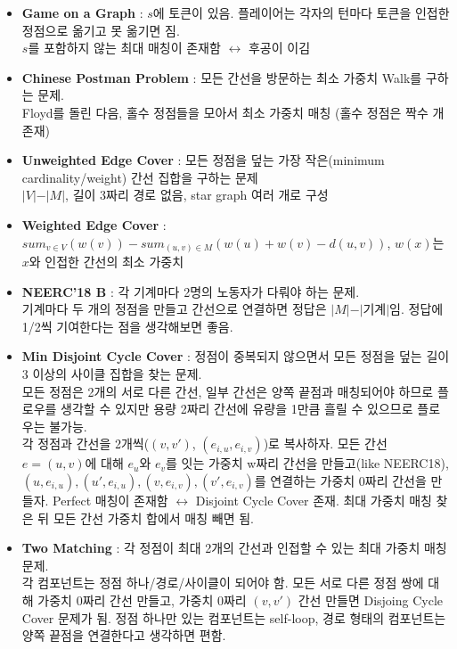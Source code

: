 \documentclass[landscape, 8pt, a4paper, oneside, twocolumn]{extarticle}
\begin{document}
\begin{itemize}
    \setlength\itemsep{0.1em}
    \item \textbf{Game on a Graph} : $s$에 토큰이 있음. 플레이어는 각자의 턴마다 토큰을 인접한 정점으로 옮기고 못 옮기면 짐.\\
    $s$를 포함하지 않는 최대 매칭이 존재함 $\leftrightarrow$ 후공이 이김
    \item \textbf{Chinese Postman Problem} : 모든 간선을 방문하는 최소 가중치 Walk를 구하는 문제.\\
    Floyd를 돌린 다음, 홀수 정점들을 모아서 최소 가중치 매칭 (홀수 정점은 짝수 개 존재)
    \item \textbf{Unweighted Edge Cover} : 모든 정점을 덮는 가장 작은(minimum cardinality/weight) 간선 집합을 구하는 문제\\
    $\vert V\vert - \vert M\vert$, 길이 3짜리 경로 없음, star graph 여러 개로 구성
    \item \textbf{Weighted Edge Cover} : $sum_{v \in V}(w(v)) - sum_{(u,v) \in M}(w(u) + w(v) - d(u,v))$, $w(x)$는 $x$와 인접한 간선의 최소 가중치
    \item \textbf{NEERC'18 B} : 각 기계마다 2명의 노동자가 다뤄야 하는 문제.\\
    기계마다 두 개의 정점을 만들고 간선으로 연결하면 정답은 $\vert M\vert - \vert\text{기계}\vert$임. 정답에 1/2씩 기여한다는 점을 생각해보면 좋음.
    \item \textbf{Min Disjoint Cycle Cover} : 정점이 중복되지 않으면서 모든 정점을 덮는 길이 3 이상의 사이클 집합을 찾는 문제.\\
    모든 정점은 2개의 서로 다른 간선, 일부 간선은 양쪽 끝점과 매칭되어야 하므로 플로우를 생각할 수 있지만 용량 2짜리 간선에 유량을 1만큼 흘릴 수 있으므로 플로우는 불가능.\\
    각 정점과 간선을 2개씩($(v, v')$, $(e_{i,u},e_{i,v})$)로 복사하자. 모든 간선 $e=(u,v)$에 대해 $e_u$와 $e_v$를 잇는 가중치 w짜리 간선을 만들고(like NEERC18), $(u,e_{i,u}), (u',e_{i,u}), (v,e_{i,v}), (v',e_{i,v})$를 연결하는 가중치 0짜리 간선을 만들자. Perfect 매칭이 존재함 $\leftrightarrow$ Disjoint Cycle Cover 존재. 최대 가중치 매칭 찾은 뒤 모든 간선 가중치 합에서 매칭 빼면 됨.
    \item \textbf{Two Matching} : 각 정점이 최대 2개의 간선과 인접할 수 있는 최대 가중치 매칭 문제.\\
    각 컴포넌트는 정점 하나/경로/사이클이 되어야 함. 모든 서로 다른 정점 쌍에 대해 가중치 0짜리 간선 만들고, 가중치 0짜리 $(v,v')$ 간선 만들면 Disjoing Cycle Cover 문제가 됨. 정점 하나만 있는 컴포넌트는 self-loop, 경로 형태의 컴포넌트는 양쪽 끝점을 연결한다고 생각하면 편함.
\end{itemize}
\end{document}
